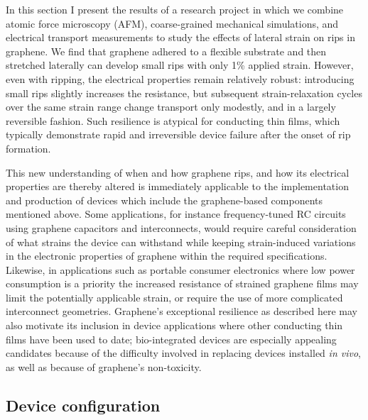 \documentclass[edeposit,fullpage,draftthesis]{uiucthesis2009}
\begin{document}
        
        In this section I present the results of a research project in which 
        we combine atomic force microscopy (AFM), coarse-grained
        mechanical simulations, and electrical transport measurements to study the
        effects of lateral strain on rips in graphene. We find that graphene adhered to
        a flexible substrate and then stretched laterally can develop small rips with
        only 1\% applied strain. However, even with ripping, the electrical properties
        remain relatively robust: introducing small rips slightly increases the
        resistance, but subsequent strain-relaxation cycles over the same strain range
        change transport only modestly, and in a largely reversible fashion. Such
        resilience is atypical for conducting thin films, which typically demonstrate
        rapid and irreversible device failure after the onset of rip
        formation\cite{Cairns2000,Fortunato2002}.
    
        This new understanding of when and how graphene rips, and how its electrical
        properties are thereby altered is immediately applicable to the implementation
        and production of devices which include the graphene-based components mentioned
        above. Some applications, for instance frequency-tuned RC circuits using
        graphene capacitors and interconnects, would require careful consideration of
        what strains the device can withstand while keeping strain-induced variations
        in the electronic properties of graphene within the required specifications.
        Likewise, in applications such as portable consumer electronics where low power
        consumption is a priority the increased resistance of strained graphene films
        may limit the potentially applicable strain, or require the use of more
        complicated interconnect geometries\cite{Kim2011}. Graphene's exceptional
        resilience as described here may also motivate its inclusion in device
        applications where other conducting thin films have been used to date;
        bio-integrated devices\cite{Viventi2010} are especially appealing candidates
        because of the difficulty involved in replacing devices installed \textit{in
        vivo}, as well as because of graphene's non-toxicity.
       
    \subsection{Device configuration}
    
\end{document}
